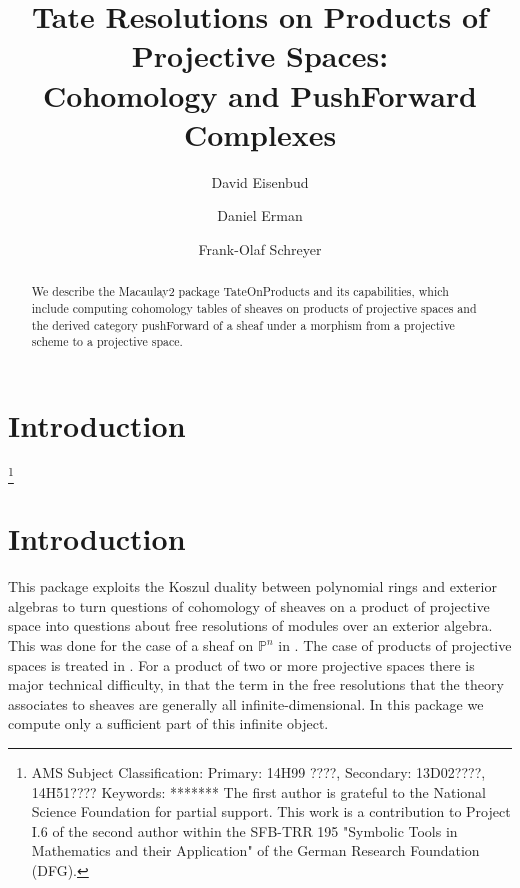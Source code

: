 \documentclass[twoside,12pt, leqno]{amsart}
\author[David Eisenbud]{David Eisenbud}
\author{Daniel Erman}
\author[Frank-Olaf Schreyer]{Frank-Olaf Schreyer}
\title{Tate Resolutions on Products of Projective Spaces: \\ Cohomology and PushForward Complexes}
\def\PP{{\mathbb P}}
\begin{document}
\begin{abstract}
We describe the  Macaulay2 package TateOnProducts and its capabilities, which include computing cohomology tables of sheaves
on products of projective spaces and the derived category pushForward of a sheaf under a morphism from a projective scheme to
a projective space.
\end{abstract}

\maketitle

\section*{Introduction} 
\let\thefootnote\relax\footnote{
\noindent AMS Subject Classification:
Primary: 14H99 ????,
Secondary: 13D02????, 14H51???? \smallbreak
Keywords: *******\smallbreak
The first author is grateful to the
National Science Foundation for partial support. This work is a contribution to Project I.6 of the second author within the SFB-TRR 195 "Symbolic Tools in Mathematics and their Application" of the German Research Foundation (DFG).}


\section*{Introduction}

This package exploits the Koszul duality between polynomial rings and exterior algebras to turn questions of cohomology of sheaves on a product of projective space into questions about free resolutions of modules over an exterior algebra. This was done for the case of a sheaf on $\PP^n$ in
\cite{EFS}. The case of products of projective spaces is treated in \cite{EES}. For a product of two or more projective
spaces there is major technical difficulty, in that the term in the free resolutions that the theory
associates to sheaves are generally all infinite-dimensional. In this package we compute only a sufficient
part of this infinite object.
\end{document}
